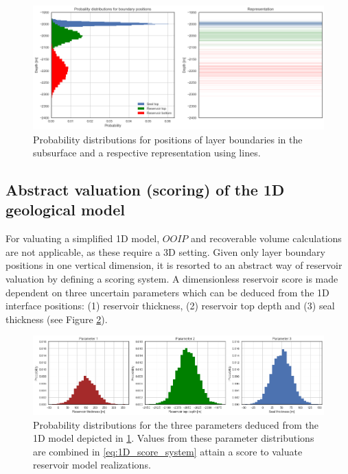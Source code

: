 			\begin{figure}[h]
				\centering
				\includegraphics[width=1\textwidth]{Figures/1D_model.png}
				\caption{Probability distributions for positions of layer boundaries in the subsurface and a respective representation using lines.}\label{fig:1D_model}
			\end{figure}
		
	        \subsection{Abstract valuation (scoring) of the 1D geological model}\label{sec:1D_score_system}
	        For valuating a simplified 1D model, $OOIP$ and recoverable volume calculations are not applicable, as these require a 3D setting. Given only layer boundary positions in one vertical dimension, it is resorted to an abstract way of reservoir valuation by defining a scoring system. A dimensionless reservoir score is made dependent on three uncertain parameters which can be deduced from the 1D interface positions: (1) reservoir thickness, (2) reservoir top depth and (3) seal thickness (see Figure \ref{fig:3_parameters}).
	        	
	        \begin{figure}[h]
	        	\centering
	        	\includegraphics[width=1\textwidth]{Figures/3_parameters.png}
	        	\caption{Probability distributions for the three parameters deduced from the 1D model depicted in \ref{fig:1D_model}. Values from these parameter distributions are combined in \ref{eq:1D_score_system} attain a score to valuate reservoir model realizations.}\label{fig:3_parameters}
	        \end{figure}
	        
